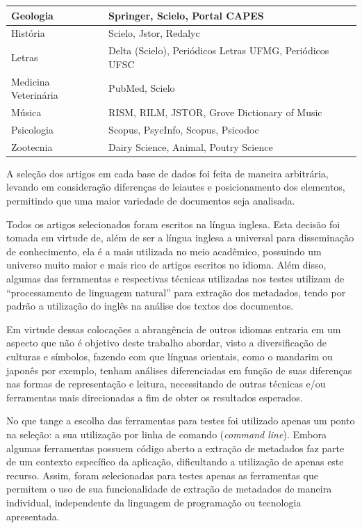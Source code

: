 \begin{table}
\begin{center}
\begin{tabular}{|p{6cm}|p{8cm}|}
            Geologia & Springer, Scielo, Portal CAPES \\
            \hline
            História & Scielo, Jstor, Redalyc \\
            \hline
            Letras & Delta (Scielo), Periódicos Letras UFMG, Periódicos UFSC \\
            \hline
            Medicina Veterinária & PubMed, Scielo \\
            \hline
            Música & RISM, RILM, JSTOR, Grove Dictionary of Music \\
            \hline
            Psicologia & Scopus, PsycInfo, Scopus, Psicodoc \\
            \hline
            Zootecnia & Dairy Science, Animal, Poutry Science \\
            \hline
        \end{tabular}
    \end{center}
    \label{tab:databases}
\end{table}

A seleção dos artigos em cada base de dados foi feita de maneira arbitrária, levando em consideração diferenças de leiautes e posicionamento dos elementos, permitindo que uma maior variedade de documentos seja analisada.


Todos os artigos selecionados foram escritos na língua inglesa. Esta decisão foi tomada em virtude de, além de ser a língua inglesa a universal para disseminação de conhecimento, ela é a mais utilizada no meio acadêmico, possuindo um universo muito maior e mais rico de artigos escritos no idioma. Além disso, algumas das ferramentas e respectivas técnicas utilizadas nos testes utilizam de ``processamento de linguagem natural'' para extração dos metadados, tendo por padrão a utilização do inglês na análise dos textos dos documentos.

Em virtude dessas colocações a abrangência de outros idiomas entraria em um aspecto que não é objetivo deste trabalho abordar, visto a diversificação de culturas e símbolos, fazendo com que línguas orientais, como o mandarim ou japonês por exemplo, tenham análises diferenciadas em função de suas diferenças nas formas de representação e leitura, necessitando de outras técnicas e/ou ferramentas mais direcionadas a fim de obter os resultados esperados.

No que tange a escolha das ferramentas para testes foi utilizado apenas um ponto na seleção: a sua utilização por linha de comando (\emph{command line}). Embora algumas ferramentas possuem código aberto a extração de metadados faz parte de um contexto específico da aplicação, dificultando a utilização de apenas este recurso. Assim, foram selecionadas para testes apenas as ferramentas que permitem o uso de sua funcionalidade de extração de metadados de maneira individual, independente da linguagem de programação ou tecnologia apresentada. 

